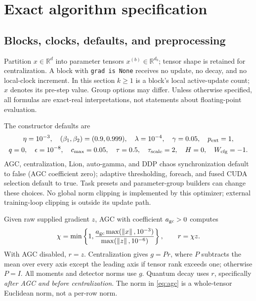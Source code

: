 \documentclass[11pt]{article}
\theoremstyle{definition}
\theoremstyle{remark}
\newcommand{\R}{\mathbb R}
\newcommand{\norm}[1]{\left\lVert#1\right\rVert}
\begin{document}
\section{Exact algorithm specification}\label{sec:algorithm}
\subsection{Blocks, clocks, defaults, and preprocessing}
Partition $x\in\R^d$ into parameter tensors $x^{(b)}\in\R^{d_b}$; tensor shape
is retained for centralization. A block with \texttt{grad is None} receives no
update, no decay, and no local-clock increment. In this section $k\ge1$ is a
block's local active-update count; $x$ denotes its pre-step value. Group options
may differ. Unless otherwise specified, all formulas are exact-real
interpretations, not statements about floating-point evaluation.

The constructor defaults are
\[
\begin{gathered}
\eta=10^{-3},\quad (\beta_1,\beta_2)=(0.9,0.999),\quad
\lambda=10^{-4},\quad \gamma=0.05,\quad p_{\rm ext}=1,\\
q=0,\quad \epsilon=10^{-8},\quad c_{\max}=0.05,\quad
\tau=0.5,\quad \tau_{\rm scale}=2,\quad H=0,\quad W_{\rm cfg}=-1.
\end{gathered}
\]
AGC, centralization, Lion, auto-gamma, and DDP chaos synchronization default to
false (AGC coefficient zero); adaptive thresholding, foreach, and fused CUDA
selection default to true. Task presets and parameter-group builders can
change these choices. No global norm clipping is implemented by this optimizer;
external training-loop clipping is outside its update path.

Given raw supplied gradient $z$, AGC with coefficient $a_{\rm gc}>0$ computes
\begin{equation}\label{eq:agc}
\chi=\min\left\{1,
\frac{a_{\rm gc}\max(\norm{x},10^{-3})}{\max(\norm{z},10^{-6})}\right\},
\qquad r=\chi z.
\end{equation}
With AGC disabled, $r=z$. Centralization gives $g=Pr$, where $P$ subtracts the
mean over every axis except the leading axis if tensor rank exceeds one;
otherwise $P=I$. All moments and detector norms use $g$. Quantum decay uses
$r$, specifically \emph{after AGC and before centralization}. The norm in
\eqref{eq:agc} is a whole-tensor Euclidean norm, not a per-row norm.
\end{document}
